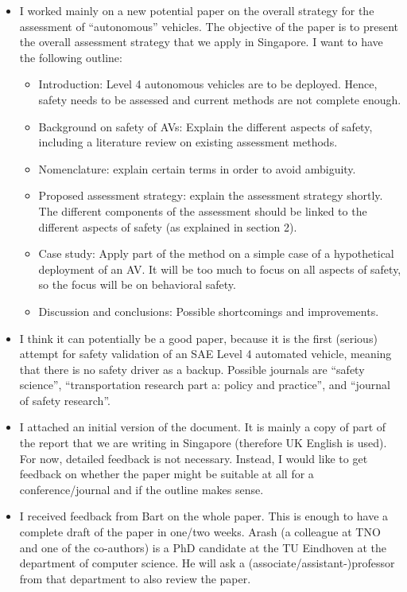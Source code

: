 \documentclass[10pt,final,a4paper,oneside,onecolumn]{article}
\begin{document}
\begin{itemize}
	\item I worked mainly on a new potential paper on the overall strategy for the assessment of ``autonomous'' vehicles. The objective of the paper is to present the overall assessment strategy that we apply in Singapore. I want to have the following outline:
	\begin{itemize}
		\item Introduction: Level 4 autonomous vehicles are to be deployed. Hence, safety needs to be assessed and current methods are not complete enough.
		\item Background on safety of AVs: Explain the different aspects of safety, including a literature review on existing assessment methods. 
		\item Nomenclature: explain certain terms in order to avoid ambiguity. 
		\item Proposed assessment strategy: explain the assessment strategy shortly. The different components of the assessment should be linked to the different aspects of safety (as explained in section 2). 
		\item Case study: Apply part of the method on a simple case of a hypothetical deployment of an AV. It will be too much to focus on all aspects of safety, so the focus will be on behavioral safety.
		\item Discussion and conclusions: Possible shortcomings and improvements.
	\end{itemize}
	\item I think it can potentially be a good paper, because it is the first (serious) attempt for safety validation of an SAE Level 4 automated vehicle, meaning that there is no safety driver as a backup. Possible journals are ``safety science'', ``transportation research part a: policy and practice'', and ``journal of safety research''. 
	\item I attached an initial version of the document. It is mainly a copy of part of the report that we are writing in Singapore (therefore UK English is used). For now, detailed feedback is not necessary. Instead, I would like to get feedback on whether the paper might be suitable at all for a conference/journal and if the outline makes sense.
	
	\item I received feedback from Bart on the whole paper. This is enough to have a complete draft of the paper in one/two weeks. Arash (a colleague at TNO and one of the co-authors) is a PhD candidate at the TU Eindhoven at the department of computer science. He will ask a (associate/assistant-)professor from that department to also review the paper.
\end{itemize}
\end{document}

